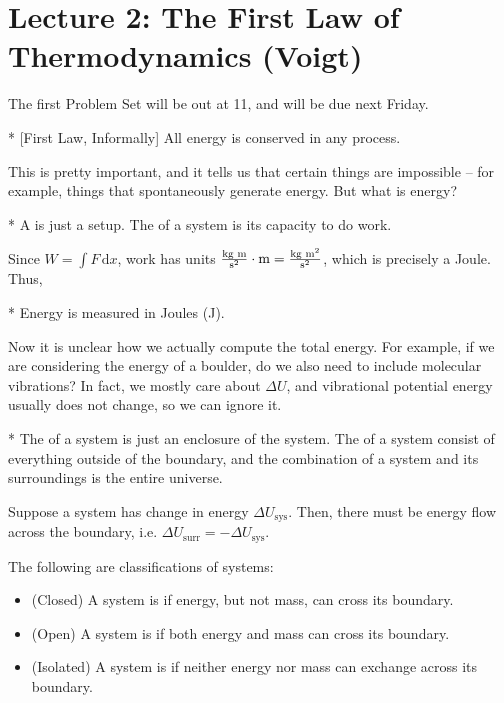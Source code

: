 \section*{Lecture 2: The First Law of Thermodynamics (Voigt)}
\setcounter{section}{2}
\setcounter{subsection}{0}
\setcounter{defncontainer}{0}
\setcounter{defn}{0}

The first Problem Set will be out at 11, and will be due next Friday.

\begin{law}*
	[First Law, Informally]
	All energy is conserved in any process.
\end{law}

This is pretty important, and it tells us that certain things are impossible -- for example, things that spontaneously generate energy.
But what is energy?

\begin{defn}*
	A  is just a setup. The  of a system is its capacity to do work.
\end{defn}

Since $W = \int F\,\text{d} x$, work has units $\frac{\text{kg m}}{\text{s}{}^2} \cdot \text m = \frac{\text{kg m}{}^2}{\text{s}{}^2}$, which is precisely a Joule. Thus,

\begin{fact}*
	Energy is measured in Joules (J).
\end{fact}

Now it is unclear how we actually compute the total energy. For example, if we are considering the energy of a boulder, do we also need to include molecular vibrations? In fact, we mostly care about $\Delta U$, and vibrational potential energy usually does not change, so we can ignore it.

\begin{defn}*
	The  of a system is just an enclosure of the system. The  of a system consist of everything outside of the boundary, and the combination of a system and its surroundings is the entire universe.
\end{defn}

Suppose a system has change in energy $\Delta U_{\text{sys}}$. Then, there must be energy flow across the boundary, i.e. $\Delta U_{\text{surr}} = -\Delta U_{\text{sys}}$.

\begin{defn}
	The following are classifications of systems:
	\begin{itemize}
		\item (Closed) A system is  if energy, but not mass, can cross its boundary.
		\item (Open) A system is  if both energy and mass can cross its boundary.
		\item (Isolated) A system is  if neither energy nor mass can exchange across its boundary.
	\end{itemize}
\end{defn}

